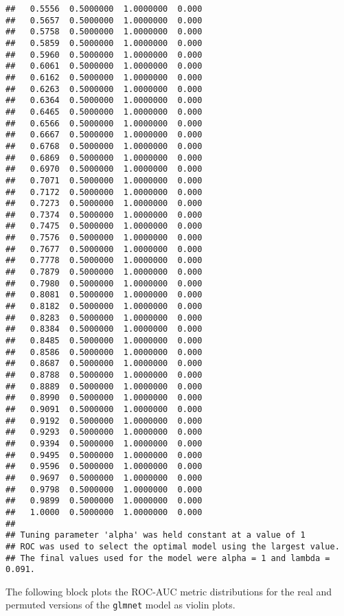\documentclass[]{article}
\begin{document}
\begin{verbatim}
##   0.5556  0.5000000  1.0000000  0.000
##   0.5657  0.5000000  1.0000000  0.000
##   0.5758  0.5000000  1.0000000  0.000
##   0.5859  0.5000000  1.0000000  0.000
##   0.5960  0.5000000  1.0000000  0.000
##   0.6061  0.5000000  1.0000000  0.000
##   0.6162  0.5000000  1.0000000  0.000
##   0.6263  0.5000000  1.0000000  0.000
##   0.6364  0.5000000  1.0000000  0.000
##   0.6465  0.5000000  1.0000000  0.000
##   0.6566  0.5000000  1.0000000  0.000
##   0.6667  0.5000000  1.0000000  0.000
##   0.6768  0.5000000  1.0000000  0.000
##   0.6869  0.5000000  1.0000000  0.000
##   0.6970  0.5000000  1.0000000  0.000
##   0.7071  0.5000000  1.0000000  0.000
##   0.7172  0.5000000  1.0000000  0.000
##   0.7273  0.5000000  1.0000000  0.000
##   0.7374  0.5000000  1.0000000  0.000
##   0.7475  0.5000000  1.0000000  0.000
##   0.7576  0.5000000  1.0000000  0.000
##   0.7677  0.5000000  1.0000000  0.000
##   0.7778  0.5000000  1.0000000  0.000
##   0.7879  0.5000000  1.0000000  0.000
##   0.7980  0.5000000  1.0000000  0.000
##   0.8081  0.5000000  1.0000000  0.000
##   0.8182  0.5000000  1.0000000  0.000
##   0.8283  0.5000000  1.0000000  0.000
##   0.8384  0.5000000  1.0000000  0.000
##   0.8485  0.5000000  1.0000000  0.000
##   0.8586  0.5000000  1.0000000  0.000
##   0.8687  0.5000000  1.0000000  0.000
##   0.8788  0.5000000  1.0000000  0.000
##   0.8889  0.5000000  1.0000000  0.000
##   0.8990  0.5000000  1.0000000  0.000
##   0.9091  0.5000000  1.0000000  0.000
##   0.9192  0.5000000  1.0000000  0.000
##   0.9293  0.5000000  1.0000000  0.000
##   0.9394  0.5000000  1.0000000  0.000
##   0.9495  0.5000000  1.0000000  0.000
##   0.9596  0.5000000  1.0000000  0.000
##   0.9697  0.5000000  1.0000000  0.000
##   0.9798  0.5000000  1.0000000  0.000
##   0.9899  0.5000000  1.0000000  0.000
##   1.0000  0.5000000  1.0000000  0.000
## 
## Tuning parameter 'alpha' was held constant at a value of 1
## ROC was used to select the optimal model using the largest value.
## The final values used for the model were alpha = 1 and lambda = 0.091.
\end{verbatim}

The following block plots the ROC-AUC metric distributions for the real
and permuted versions of the \texttt{glmnet} model as violin plots.
\end{document}
